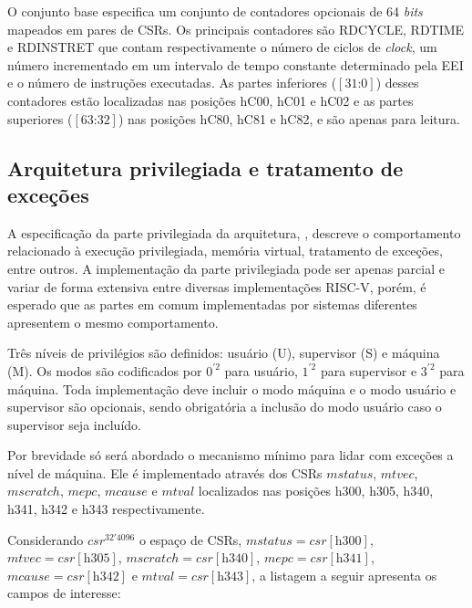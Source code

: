   O conjunto base especifica um conjunto de contadores opcionais de 64 \emph{bits} mapeados em pares de CSRs.
  Os principais contadores são RDCYCLE, RDTIME e RDINSTRET que contam respectivamente o número de ciclos 
  de \emph{clock}, um número incrementado em um intervalo de tempo constante determinado pela EEI e o número de 
  instruções executadas. As partes inferiores ($[31\text{:}0]$) desses contadores estão localizadas nas posições
  hC00, hC01 e hC02 e as partes superiores ($[63\text{:}32]$) nas posições hC80, hC81 e hC82, e são apenas para leitura.

\subsection{Arquitetura privilegiada e tratamento de exceções}
\label{sec:excep}

  A especificação da parte privilegiada da arquitetura, \cite{RVS2}, descreve o comportamento relacionado
  à execução privilegiada, memória virtual, tratamento de exceções, entre outros. A implementação da parte privilegiada 
  pode ser apenas parcial e variar de forma extensiva entre diversas implementações RISC-V, porém, é
  esperado que as partes em comum implementadas por sistemas diferentes apresentem o mesmo comportamento.

  Três níveis de privilégios são definidos: usuário (U), supervisor (S) e máquina (M). Os modos são codificados por
  $0^{'2}$ para usuário, $1^{'2}$ para supervisor e $3^{'2}$ para máquina. Toda implementação deve incluir o modo
  máquina e o modo usuário e supervisor são opcionais, sendo obrigatória a inclusão do modo usuário caso o supervisor
  seja incluído.

  Por brevidade só será abordado o mecanismo mínimo para lidar com exceções a nível de máquina.
  Ele é implementado através dos CSRs $mstatus$, $mtvec$, $mscratch$, $mepc$, $mcause$ e $mtval$ localizados nas
  posições h300, h305, h340, h341, h342 e h343 respectivamente.

  Considerando $csr^{32'4096}$ o espaço de CSRs, $mstatus = csr[\text{h300}]$,
  $mtvec = csr[\text{h305}]$, 
  $mscratch = csr[\text{h340}]$, 
  $mepc = csr[\text{h341}]$, 
  $mcause = csr[\text{h342}]$ e
  $mtval = csr[\text{h343}]$, a listagem a seguir apresenta os campos de interesse:


